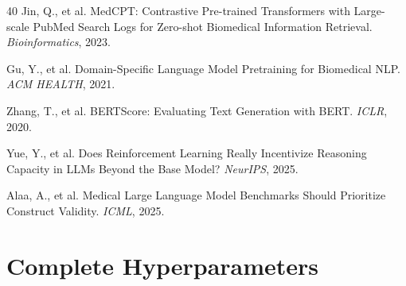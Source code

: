\documentclass{article}
\begin{document}
\begin{thebibliography}{40}
Jin, Q., et al.
\newblock MedCPT: Contrastive Pre-trained Transformers with Large-scale PubMed Search Logs for Zero-shot Biomedical Information Retrieval.
\newblock \emph{Bioinformatics}, 2023.

Gu, Y., et al.
\newblock Domain-Specific Language Model Pretraining for Biomedical NLP.
\newblock \emph{ACM HEALTH}, 2021.

Zhang, T., et al.
\newblock BERTScore: Evaluating Text Generation with BERT.
\newblock \emph{ICLR}, 2020.

Yue, Y., et al.
\newblock Does Reinforcement Learning Really Incentivize Reasoning Capacity in LLMs Beyond the Base Model?
\newblock \emph{NeurIPS}, 2025.

Alaa, A., et al.
\newblock Medical Large Language Model Benchmarks Should Prioritize Construct Validity.
\newblock \emph{ICML}, 2025.

\end{thebibliography}

\appendix

\section{Complete Hyperparameters}
\label{app:hyperparams}
\end{document}
